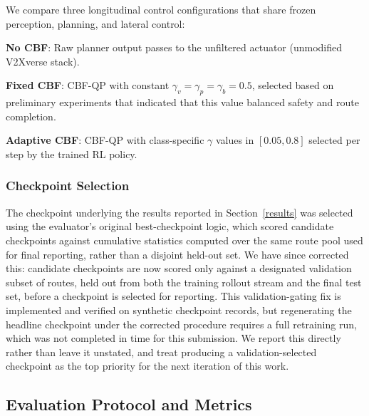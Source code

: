 We compare three longitudinal control configurations that share frozen perception, planning, and lateral control:

\textbf{No CBF}: Raw planner output passes to the unfiltered actuator (unmodified V2Xverse stack).

\textbf{Fixed CBF}: CBF-QP with constant $\gamma_v{=}\gamma_p{=}\gamma_b{=}0.5$, selected based on preliminary experiments that indicated that this value balanced safety and route completion.
    
\textbf{Adaptive CBF}: CBF-QP with class-specific $\gamma$ values in $[0.05,0.8]$ selected per step by the trained RL policy.

\subsubsection{Checkpoint Selection}
\label{sec:checkpoint-selection}
The checkpoint underlying the results reported in Section~\ref{results} was selected using the evaluator's original best-checkpoint logic, which scored candidate checkpoints against cumulative statistics computed over the same route pool used for final reporting, rather than a disjoint held-out set. We have since corrected this: candidate checkpoints are now scored only against a designated validation subset of routes, held out from both the training rollout stream and the final test set, before a checkpoint is selected for reporting. This validation-gating fix is implemented and verified on synthetic checkpoint records, but regenerating the headline checkpoint under the corrected procedure requires a full retraining run, which was not completed in time for this submission. We report this directly rather than leave it unstated, and treat producing a validation-selected checkpoint as the top priority for the next iteration of this work.

\subsection{Evaluation Protocol and Metrics}

